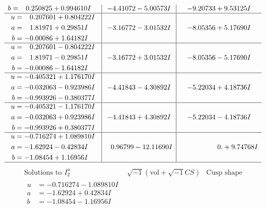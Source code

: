 \documentclass[1p]{elsarticle_modified}
\theoremstyle{definition}
\newcommand{\I}{\sqrt{-1}}
\begin{document}
$$\begin{array}{c|c|c}
\begin{aligned}
b &= \phantom{-}0.250825 + 0.994610 I\end{aligned}
 & -4.41072 - 5.00573 I & -9.20733 + 9.53125 I \\ \hline\begin{aligned}
u &= \phantom{-}0.207601 + 0.804222 I \\
a &= \phantom{-}1.81971 + 0.29851 I \\
b &= -0.00086 + 1.64182 I\end{aligned}
 & -3.16772 - 3.01532 I & -8.05356 + 5.17690 I \\ \hline\begin{aligned}
u &= \phantom{-}0.207601 - 0.804222 I \\
a &= \phantom{-}1.81971 - 0.29851 I \\
b &= -0.00086 - 1.64182 I\end{aligned}
 & -3.16772 + 3.01532 I & -8.05356 - 5.17690 I \\ \hline\begin{aligned}
u &= -0.405321 + 1.176170 I \\
a &= -0.032063 - 0.923986 I \\
b &= -0.993926 - 0.380377 I\end{aligned}
 & -4.41843 - 4.30892 I & -5.22034 + 4.18736 I \\ \hline\begin{aligned}
u &= -0.405321 - 1.176170 I \\
a &= -0.032063 + 0.923986 I \\
b &= -0.993926 + 0.380377 I\end{aligned}
 & -4.41843 + 4.30892 I & -5.22034 - 4.18736 I \\ \hline\begin{aligned}
u &= -0.716274 + 1.089810 I \\
a &= -1.62924 - 0.42834 I \\
b &= -1.08454 + 1.16956 I\end{aligned}
 & \phantom{-}0.96799 - 12.11690 I & \phantom{-0.000000 -}0. + 9.74768 I\\
 \hline 
 \end{array}$$\newpage$$\begin{array}{c|c|c}  
\text{Solutions to }I^u_{2}& \I (\text{vol} + \sqrt{-1}CS) & \text{Cusp shape}\\
 \hline 
\begin{aligned}
u &= -0.716274 - 1.089810 I \\
a &= -1.62924 + 0.42834 I \\
b &= -1.08454 - 1.16956 I\end{aligned}

\end{array}$$
\end{document}
